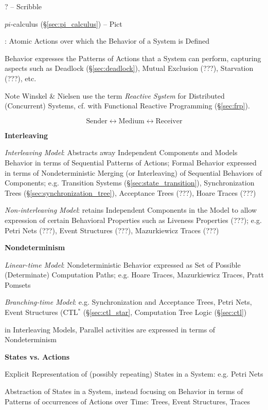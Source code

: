 ? -- Scribble

$pi$-calculus (\S\ref{sec:pi_calculus}) -- Pict


\asterism


\cite{winskel-nielsen93}: Atomic Actions over which the Behavior of a
System is Defined %

Behavior expresses the Patterns of Actions that a System can perform,
capturing aspects such as Deadlock (\S\ref{sec:deadlock}), Mutual
Exclusion (???), Starvation (???), etc.

\fist Note Winskel \& Nielsen \cite{winskel-nielsen93} use the term
\emph{Reactive System} for Distributed (Concurrent) Systems, cf. with
Functional Reactive Programming (\S\ref{sec:frp}).

\[
  \text{Sender} \leftrightarrow \text{Medium}
    \leftrightarrow \text{Receiver}
\]


\textbf{Interleaving}

\emph{Interleaving Model}: Abstracts away Independent Components and
Models Behavior in terms of Sequential Patterns of Actions; Formal
Behavior expressed in terms of Nondeterministic Merging (or
Interleaving) of Sequential Behaviors of Components; e.g. Transition
Systems (\S\ref{sec:state_transition}), Synchronization Trees
(\S\ref{sec:synchronization_tree}), Acceptance Trees (???), Hoare
Traces (???) %

\emph{Non-interleaving Model}: retains Independent Components in the
Model to allow expression of certain Behavioral Properties such as
Liveness Properties (???); e.g. Petri Nets (???), Event Structures
(???), Mazurkiewicz Traces (???)


\textbf{Nondeterminism}

\emph{Linear-time Model}: Nondeterministic Behavior expressed as Set of
Possible (Determinate) Computation Paths; e.g. Hoare Traces,
Mazurkiewicz Traces, Pratt Pomsets

\emph{Branching-time Model}: e.g. Synchronization and Acceptance
Trees, Petri Nets, Event Structures (CTL$^*$ (\S\ref{sec:ctl_star},
Computation Tree Logic (\S\ref{sec:ctl})


in Interleaving Models, Parallel activities are expressed in terms of
Nondeterminism


\textbf{States vs. Actions}

Explicit Representation of (possibly repeating) States in a System:
e.g. Petri Nets

Abstraction of States in a System, instead focusing on Behavior in
terms of Patterns of occurrences of Actions over Time: Trees, Event
Structures, Traces



